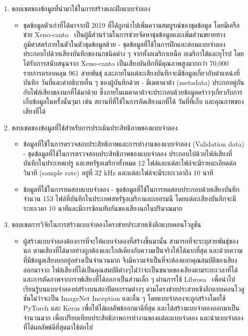 \begin{enumerate}
    \item ขอบเขตของข้อมูลที่นำมาใช้ในการสร้างและฝึกแบบจำลอง
    \begin{itemize}
        \item ชุดข้อมูลตัวเก่าที่ได้มาจากปี 2019 ที่ได้ถูกนำไปเพิ่มความสมบูรณ์ของชุดข้อมูล โดยมีเครือข่าย Xeno-canto~\cite{xeno-canto} เป็นผู้มีส่วนร่วมในการช่วยจัดหาชุดข้อมูลและเพิ่มส่วนขยายทางภูมิศาสตร์ภายในตัวในตัวชุดข้อมูลด้วย
        \subitem - ชุดข้อมูลที่ใช้ในการฝึกและสอนแบบจำลอง ประกอบไปด้วยเสียงบันทึกของนกชนิดต่าง ๆ จากทั้งอเมริกาเหนือ อเมริกาใต้และยุโรป โดยได้รับการสนับสนุนจาก Xeno-canto เป็นเสียงบันทึกที่มีคุณภาพสูงมากกว่า 70,000 รายการครอบคลุม 961 สายพันธุ์ 
        และภายในแต่ละเสียงบันทึกจะมีข้อมูลเกี่ยวกับตำแหน่งที่บันทึก วันที่และคำอธิบายอื่น ๆ ของผู้บันทึกด้วย
        \subitem - มีเมตาดาต้า (metadata) ประกอบคู่กันกับไฟล์เสียงของนกที่ได้มาด้วย ซึ่งภายในเมตาดาต้าจะประกอบด้วยข้อมูลคร่าวๆเกี่ยวกับการเก็บข้อมูลในครั้งนั้นๆมา เช่น สถานที่ที่ใช้ในการอัดเสียงนกที่ได้ วันที่ที่เก็บ และคุณภาพของเสียงที่ได้
    \end{itemize}
    \item ขอบเขตของข้อมูลที่ใช้สำหรับการประเมินประสิทธิภาพของแบบจำลอง
    \begin{itemize}
        \item ข้อมูลที่ใช้ในการตรวจสอบประสิทธิภาพและการทำงานของแบบจำลอง (Validation data)
        \subitem - ชุดข้อมูลที่ใช้ในการตรวจสอบประสิทธิภาพของแบบจำลอง ประกอบไปด้วยไฟล์เสียงที่บันทึกในประเทศเปรู และสหรัฐอเมริกาทั้งหมด 12 ไฟล์และแต่ละไฟล์จะมีรายละเอียดต่อวินาที (sample rate) อยู่ที่ 32 kHz และแต่ละไฟล์จะมีระยะเวลาถึง 10 นาที
        \item ข้อมูลที่ใช้ในการทดสอบแบบจำลอง
        \subitem - ชุดข้อมูลที่ใช้ในการทดสอบประกอบด้วยเสียงบันทึกจำนวน 153 ไฟล์ที่บันทึกในประเทศสหรัฐอเมริกาและเยอรมนี โดยแต่ละเสียงบันทึกจะมีระยะเวลา 10 นาทีและมีการซ้อนทับกันของเสียงนกในปริมาณมาก
    \end{itemize} 
    \item ขอบเขตการวิจัยในการสร้างแบบจำลองโครงข่ายประสาทเชิงลึกแบบคอนโวลูชัน
    \begin{itemize}
        \item ผู้สร้างแบบจำลองต้องการที่จะให้แบบจำลองที่สร้างขี้นมานั้น สามารถที่จะระบุสายพันธุ์ของนก ตามเสียงที่ได้มาอย่างถูกต้องและใกล้เคียงกับความเป็นจริงให้ได้มากที่สุด และด้วยความที่มีข้อมูลเสียงยกอยู่อย่างเป็นจำนวนมาก 
        จึงมีความจำเป็นที่จะต้องแยกคุณสมบัติของเสียงออกมาจาก ไฟล์เสียงที่ได้เป็นคุณสมบัติต่างๆไม่ว่าจะเป็นขนาดของเสียงตามระยะเวลาที่ได้ และการตัดภาพจากกราฟเสียงที่ได้ออกาเป็นส่วนเล็ก ๆ 
        ผ่านการใช้ Librosa~\cite{mcfee_librosa/librosa:_2020} เพื่อนำไปเรียนรู้บนแบบจำลองท่สร้างบนสถาปัตยกรรมต่างๆ ตามโครงข่ายประสาทเชิงลึกแบบคอนโวลูชันไม่ว่าจะเป็น ImageNet Inception  และอื่น ๆ โดยแบบจำลองจะถูกสร้างโดยใช้ 
        PyTorch และ Keras เพื่อให้ได้ผลลัพธ์ออกมาดีที่สุด และได้สร้างแบบจำลองออกมาเป็นจำนวนมาก เพื่อเปรียบเทียบประสิทธิภาพการทำงานของแต่ละแบบจำลอง และนำแบบจำลองที่ได้ผลลัพธ์ดีที่สุดมาใช้ต่อไป
    \end{itemize}
\end{enumerate}


